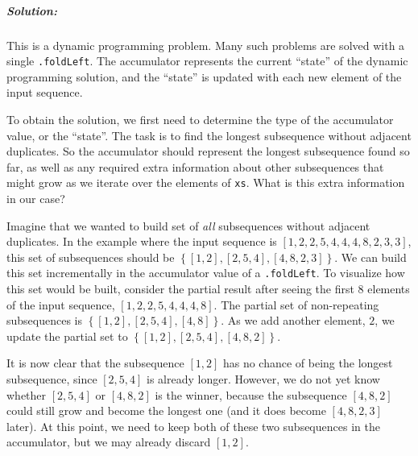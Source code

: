 \subparagraph{Solution:}

This is a dynamic programming problem. Many such problems are solved
with a single \lstinline!.foldLeft!.
The accumulator represents the current ``state'' of the dynamic
programming solution, and the ``state'' is updated with each new
element of the input sequence.

To obtain the solution, we first need to determine the type of the
accumulator value, or the ``state''. The task is to find the longest
subsequence without adjacent duplicates. So the accumulator should
represent the longest subsequence found so far, as well as any required
extra information about other subsequences that might grow as we iterate
over the elements of \lstinline!xs!.
What is this extra information in our case? 

Imagine that we wanted to build set of \emph{all} subsequences without
adjacent duplicates. In the example where the input sequence is $\left[1,2,2,5,4,4,4,8,2,3,3\right]$,
this set of subsequences should be $\left\{ \left[1,2\right],\left[2,5,4\right],\left[4,8,2,3\right]\right\} $.
We can build this set incrementally in the accumulator value of a
\lstinline!.foldLeft!.
To visualize how this set would be built, consider the partial result
after seeing the first $8$ elements of the input sequence, $\left[1,2,2,5,4,4,4,8\right]$.
The partial set of non-repeating subsequences is $\left\{ \left[1,2\right],\left[2,5,4\right],\left[4,8\right]\right\} $.
As we add another element, $2$, we update the partial set to $\left\{ \left[1,2\right],\left[2,5,4\right],\left[4,8,2\right]\right\} $.

It is now clear that the subsequence $\left[1,2\right]$ has no chance
of being the longest subsequence, since $\left[2,5,4\right]$ is already
longer. However, we do not yet know whether $\left[2,5,4\right]$
or $\left[4,8,2\right]$ is the winner, because the subsequence $\left[4,8,2\right]$
could still grow and become the longest one (and it does become $\left[4,8,2,3\right]$
later). At this point, we need to keep both of these two subsequences
in the accumulator, but we may already discard $\left[1,2\right]$.

